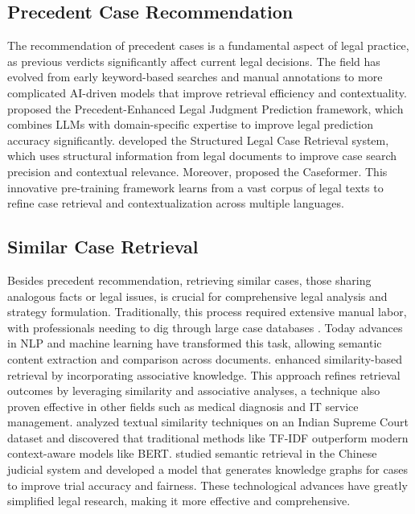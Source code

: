 \subsection{Precedent Case Recommendation}
The recommendation of precedent cases is a fundamental aspect of legal practice, as previous verdicts significantly affect current legal decisions. The field has evolved from early keyword-based searches and manual annotations to more complicated AI-driven models that improve retrieval efficiency and contextuality. \citet{wu-etal-2023-precedent} proposed the Precedent-Enhanced Legal Judgment Prediction framework, which combines LLMs with domain-specific expertise to improve legal prediction accuracy significantly. \citet{ma2023incorporating} developed the Structured Legal Case Retrieval system, which uses structural information from legal documents to improve case search precision and contextual relevance. Moreover, \citet{su2023caseformer} proposed the Caseformer. This innovative pre-training framework learns from a vast corpus of legal texts to refine case retrieval and contextualization across multiple languages.

\subsection{Similar Case Retrieval}
Besides precedent recommendation, retrieving similar cases, those sharing analogous facts or legal issues, is crucial for comprehensive legal analysis and strategy formulation. Traditionally, this process required extensive manual labor, with professionals needing to dig through large case databases \cite{mandal2021unsupervised, ma2023incorporating}. Today advances in NLP and machine learning have transformed this task, allowing semantic content extraction and comparison across documents. \citet{kang2013retrieval} enhanced similarity-based retrieval by incorporating associative knowledge. This approach refines retrieval outcomes by leveraging similarity and associative analyses, a technique also proven effective in other fields such as medical diagnosis and IT service management. \citet{mandal2021unsupervised} analyzed textual similarity techniques on an Indian Supreme Court dataset and discovered that traditional methods like TF-IDF outperform modern context-aware models like BERT. \citet{wu2021joint} studied semantic retrieval in the Chinese judicial system and developed a model that generates knowledge graphs for cases to improve trial accuracy and fairness. These technological advances have greatly simplified legal research, making it more effective and comprehensive.

